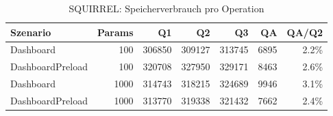 \begin{table}[ht]
\centering
\caption{SQUIRREL: Speicherverbrauch pro Operation}
\begin{tabular}{lrrrrrr}
\toprule
Szenario & Params & Q1 & Q2 & Q3 & QA & QA/Q2 \\
\midrule
		Dashboard & 100 & 306850 & 309127 & 313745 & 6895 & 2.2\% \\
		DashboardPreload & 100 & 320708 & 327950 & 329171 & 8463 & 2.6\% \\
		Dashboard & 1000 & 314743 & 318215 & 324689 & 9946 & 3.1\% \\
		DashboardPreload & 1000 & 313770 & 319338 & 321432 & 7662 & 2.4\% \\
\bottomrule
\end{tabular}
\label{tab:benchmark_squirrel_bytesperop}
\end{table}
	